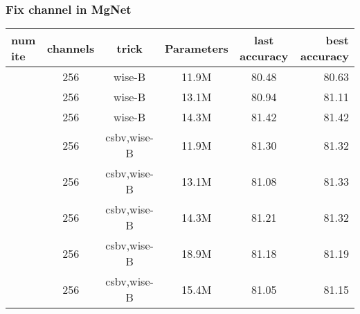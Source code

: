 \subsubsection{Fix channel in MgNet}
\begin{table}[H]
	\begin{tabular}{| l | c | c | c | c | r |}
		\hline
		num ite       &      channels        &  trick     &    Parameters   &   last accuracy   &  best accuracy  \\
		\hline
		[4,2,2,2]      &      256             &  wise-B    &    11.9M        &       80.48       &  80.63          \\
		\hline
		[6,2,2,2]      &      256             &  wise-B    &    13.1M        &       80.94       &  81.11          \\
		\hline
		[8,2,2,2]      &      256             &  wise-B    &    14.3M        &       81.42       &  81.42          \\
		\hline
		\hline
		[4,2,2,2]      &      256             &  csbv,wise-B      &    11.9M         &       81.30       &  81.32         \\
		\hline
		[6,2,2,2]      &      256             &  csbv,wise-B      &    13.1M         &       81.08       &  81.33          \\
		\hline
		[8,2,2,2]      &      256             &  csbv,wise-B      &    14.3M         &       81.21       &  81.32          \\
		\hline
		[16,2,2,2]     &      256             &  csbv,wise-B      &    18.9M         &       81.18       &  81.19          \\
		\hline
		\hline
		[3,4,6,3]      &      256             &  csbv,wise-B      &    15.4M         &       81.05       &  81.15          \\
		\hline
	\end{tabular}
\end{table}

